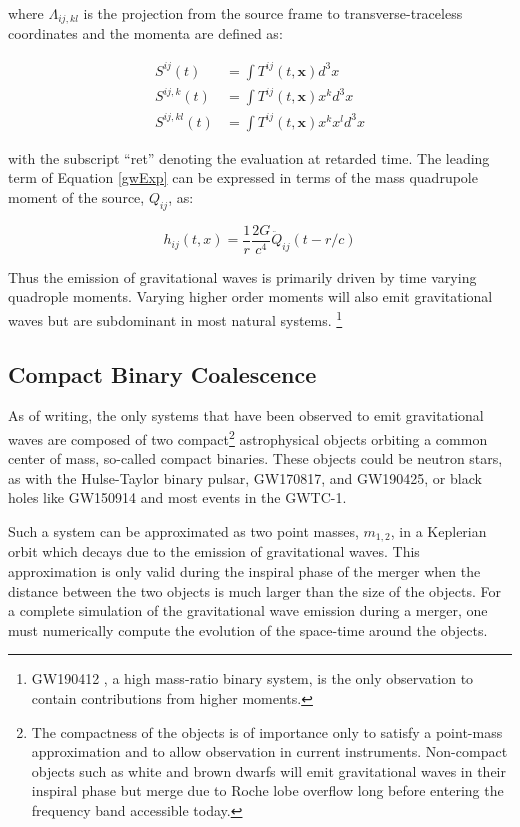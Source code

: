 \documentclass [12pt, proquest]{uwthesis}[2019]
\begin{document}
where $\Lambda_{ij,kl}$ is the projection from the source frame to transverse-traceless coordinates and the momenta are defined as:

\begin{align}
S^{ij}(t)&=\int T^{ij}(t,\mathbf{x}) d^3x\\
S^{ij,k}(t)&=\int T^{ij}(t,\mathbf{x}) x^k d^3x\\
S^{ij,kl}(t)&=\int T^{ij}(t,\mathbf{x}) x^k x^l d^3x
\end{align}

with the subscript ``ret'' denoting the evaluation at retarded time. The leading term of Equation \ref{gwExp} can be expressed in terms of the mass quadrupole moment of the source, $Q_{ij}$, as:

\begin{equation}
h_{ij}(t,x)=\frac{1}{r}\frac{2 G}{c^4} \ddot{Q}_{ij}(t-r/c)
\end{equation}

Thus the emission of gravitational waves is primarily driven by time varying quadrople moments. Varying higher order moments will also emit gravitational waves but are subdominant in most natural systems. \footnote{GW190412 \cite{GW190412}, a high mass-ratio binary system, is the only observation to contain contributions from higher moments.}

\subsection{Compact Binary Coalescence}\label{CBC}

As of writing, the only systems that have been observed to emit gravitational waves are composed of two compact\footnote{The compactness of the objects is of importance only to satisfy a point-mass approximation and to allow observation in current instruments. Non-compact objects such as white and brown dwarfs will emit gravitational waves in their inspiral phase but merge due to Roche lobe overflow long before entering the frequency band accessible today.} astrophysical objects orbiting a common center of mass, so-called compact binaries. These objects could be neutron stars, as with the Hulse-Taylor binary pulsar\cite{hulseTaylor}, GW170817\cite{GW170817}, and GW190425\cite{GW190425}, or black holes like GW150914\cite{GW150914} and most events in the GWTC-1\cite{GWTC}.

Such a system can be approximated as two point masses, $m_{1,2}$, in a Keplerian orbit which decays due to the emission of gravitational waves. This approximation is only valid during the inspiral phase of the merger when the distance between the two objects is much larger than the size of the objects. For a complete simulation of the gravitational wave emission during a merger, one must numerically compute the evolution of the space-time around the objects. \cite{NGR}
\end{document}
